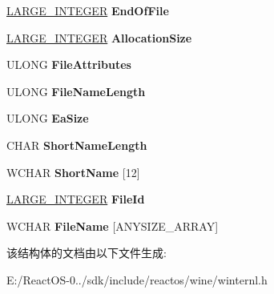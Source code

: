 \begin{DoxyCompactItemize}
\hyperlink{union___l_a_r_g_e___i_n_t_e_g_e_r}{L\+A\+R\+G\+E\+\_\+\+I\+N\+T\+E\+G\+ER} {\bfseries End\+Of\+File}
\item 
\mbox{\label{struct___f_i_l_e___i_d___b_o_t_h___d_i_r_e_c_t_o_r_y___i_n_f_o_r_m_a_t_i_o_n_a1259931390b02bab504a7a83063078da}} 
\hyperlink{union___l_a_r_g_e___i_n_t_e_g_e_r}{L\+A\+R\+G\+E\+\_\+\+I\+N\+T\+E\+G\+ER} {\bfseries Allocation\+Size}
\item 
\mbox{\label{struct___f_i_l_e___i_d___b_o_t_h___d_i_r_e_c_t_o_r_y___i_n_f_o_r_m_a_t_i_o_n_a0d7930d9cdf82047cd65d109121e84d6}} 
U\+L\+O\+NG {\bfseries File\+Attributes}
\item 
\mbox{\label{struct___f_i_l_e___i_d___b_o_t_h___d_i_r_e_c_t_o_r_y___i_n_f_o_r_m_a_t_i_o_n_a750cb2c2bf2ba181a07fd5c79585bee5}} 
U\+L\+O\+NG {\bfseries File\+Name\+Length}
\item 
\mbox{\label{struct___f_i_l_e___i_d___b_o_t_h___d_i_r_e_c_t_o_r_y___i_n_f_o_r_m_a_t_i_o_n_a67de0bb5448f724ec2d19191ec4f7f3f}} 
U\+L\+O\+NG {\bfseries Ea\+Size}
\item 
\mbox{\label{struct___f_i_l_e___i_d___b_o_t_h___d_i_r_e_c_t_o_r_y___i_n_f_o_r_m_a_t_i_o_n_a5468fbe0e10ede6db073ad662277ef45}} 
C\+H\+AR {\bfseries Short\+Name\+Length}
\item 
\mbox{\label{struct___f_i_l_e___i_d___b_o_t_h___d_i_r_e_c_t_o_r_y___i_n_f_o_r_m_a_t_i_o_n_a5582636df559b80092f696758d55c9db}} 
W\+C\+H\+AR {\bfseries Short\+Name} \mbox{[}12\mbox{]}
\item 
\mbox{\label{struct___f_i_l_e___i_d___b_o_t_h___d_i_r_e_c_t_o_r_y___i_n_f_o_r_m_a_t_i_o_n_a539cdf49fdab705a1a522d9caae6d016}} 
\hyperlink{union___l_a_r_g_e___i_n_t_e_g_e_r}{L\+A\+R\+G\+E\+\_\+\+I\+N\+T\+E\+G\+ER} {\bfseries File\+Id}
\item 
\mbox{\label{struct___f_i_l_e___i_d___b_o_t_h___d_i_r_e_c_t_o_r_y___i_n_f_o_r_m_a_t_i_o_n_a765c960fbec68cd4fba3dea238cd004a}} 
W\+C\+H\+AR {\bfseries File\+Name} \mbox{[}A\+N\+Y\+S\+I\+Z\+E\+\_\+\+A\+R\+R\+AY\mbox{]}
\end{DoxyCompactItemize}


该结构体的文档由以下文件生成\+:\begin{DoxyCompactItemize}
\item 
E\+:/\+React\+O\+S-\/0../sdk/include/reactos/wine/winternl.\+h\end{DoxyCompactItemize}
